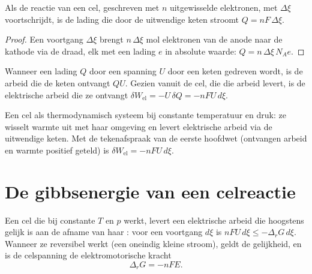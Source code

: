 \begin{proposition}\label{prop:b2:cell-thermodynamics:charge}
Als de reactie van een cel, geschreven met $n$ uitgewisselde elektronen, met
$\Delta\xi$ voortschrijdt, is de lading die door de uitwendige keten stroomt $Q =
nF\,\Delta\xi$.
\end{proposition}

\begin{proof}
Een voortgang $\Delta\xi$ brengt $n\,\Delta\xi$ mol elektronen van
de anode naar de kathode via de draad, elk met een lading $e$ in absolute waarde:
$Q = n\,\Delta\xi\,N_A e$.
\end{proof}

Wanneer een lading $Q$ door een spanning $U$ door een keten gedreven wordt, is de arbeid
die de keten ontvangt $QU$. Gezien vanuit de cel, die die arbeid levert, is
de elektrische arbeid die ze ontvangt $\delta W_{\text{el}} = -U\,\delta Q = -nFU\,
d\xi$.

\begin{omfigure}

{\small Een cel als thermodynamisch systeem bij constante temperatuur en druk:
ze wisselt warmte uit met haar omgeving en levert elektrische arbeid via
de uitwendige keten. Met de tekenafspraak van de eerste hoofdwet (ontvangen arbeid en warmte
positief geteld) is $\delta W_{\text{el}} = -nFU\,d\xi$.}
\end{omfigure}

\section{De gibbsenergie van een celreactie}

\begin{theorem}\label{thm:b2:cell-thermodynamics:delta-g-nfe}
Een cel die bij constante $T$ en $p$ werkt, levert een elektrische arbeid die hoogstens
gelijk is aan de afname van haar : voor een voortgang $d\xi$ is
$nFU\,d\xi \leq -\Delta_r G\,d\xi$. Wanneer ze reversibel werkt (een oneindig
kleine stroom), geldt de gelijkheid, en is de celspanning de
elektromotorische kracht
\[
  \Delta_r G = -nFE .
\]
\end{theorem}

